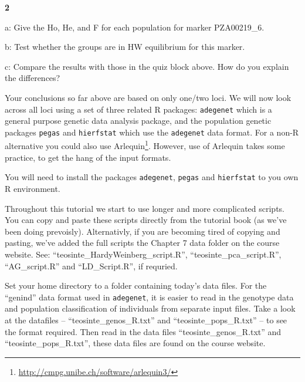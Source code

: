 \documentclass[
]{book}
\makeatletter
\renewcommand{\href}[2]{#2\footnote{\url{#1}}}
\newenvironment{kframe}{%
\medskip{}
\setlength{\fboxsep}{.8em}
 \def\at@end@of@kframe{}%
 \ifinner\ifhmode%
  \def\at@end@of@kframe{\end{minipage}}%
  \begin{minipage}{\columnwidth}%
 \fi\fi%
 \def\FrameCommand##1{\hskip\@totalleftmargin \hskip-\fboxsep
 \colorbox{shadecolor}{##1}\hskip-\fboxsep
     \hskip-\linewidth \hskip-\@totalleftmargin \hskip\columnwidth}%
 \MakeFramed {\advance\hsize-\width
   \@totalleftmargin\z@ \linewidth\hsize
   \@setminipage}}%
 {\par\unskip\endMakeFramed%
 \at@end@of@kframe}
\newenvironment{rmdblock}[1]
  {
  \begin{itemize}
  \renewcommand{\labelitemi}{
    \raisebox{-.7\height}[0pt][0pt]{
      {\setkeys{Gin}{width=3em,keepaspectratio}\texttt{[image: images/\#1]}}
    }
  }
  \setlength{\fboxsep}{1em}
  \begin{kframe}
  \item
  }
  {
  \end{kframe}
  \end{itemize}
  }
\newenvironment{rmdnote}
  {\begin{rmdblock}{note}}
  {\end{rmdblock}}
\newenvironment{rmdquiz}
  {\begin{rmdblock}{quiz}}
  {\end{rmdblock}}
\makeatother
\begin{document}
\begin{rmdquiz}
\textbf{2}

a: Give the Ho, He, and F for each population for marker PZA00219\_6.

b: Test whether the groups are in HW equilibrium for this marker.

c: Compare the results with those in the quiz block above. How do you explain the differences?
\end{rmdquiz}

Your conclusions so far above are based on only one/two loci. We will now look across all loci using a set of three related R packages: \texttt{adegenet} \citep{adegenet2008} which is a general purpose genetic data analysis package, and the population genetic packages \texttt{pegas} \citep{R-pegas} and \texttt{hierfstat} \citep{R-hierfstat} which use the \texttt{adegenet} data format. For a non-R alternative you could also use \href{http://cmpg.unibe.ch/software/arlequin3/}{Arlequin}. However, use of Arlequin takes some practice, to get the hang of the input formats.

You will need to install the packages \texttt{adegenet}, \texttt{pegas} and \texttt{hierfstat} to you own R environment.

\begin{rmdnote}
Throughout this tutorial we start to use longer and more complicated scripts. You can copy and paste these scripts directly from the tutorial book (as we've been doing prevoisly). Alternativly, if you are becoming tired of copying and pasting, we've added the full scripts the Chapter 7 data folder on the course website. See: ``teosinte\_HardyWeinberg\_script.R'', ``teosinte\_pca\_script.R'', ``AG\_script.R'' and ``LD\_Script.R'', if requried.
\end{rmdnote}

Set your home directory to a folder containing today's data files. For the ``genind'' data format used in \texttt{adegenet}, it is easier to read in the genotype data and population classification of individuals from separate input files. Take a look at the datafiles -- ``teosinte\_genos\_R.txt'' and ``teosinte\_pops\_R.txt'' -- to see the format required. Then read in the data files ``teosinte\_genos\_R.txt'' and ``teosinte\_pops\_R.txt'', these data files are found on the course website.
\end{document}
